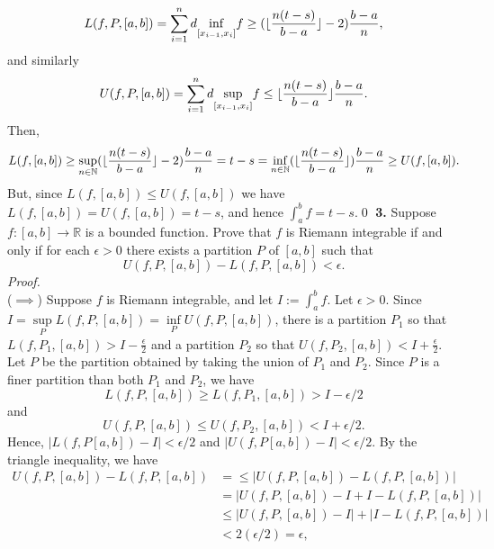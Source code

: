 \documentclass{article}
\DeclarePairedDelimiter\floor{\lfloor}{\rfloor}
\begin{document}
\begin{equation*}
    L(f,P,[a,b])=\sum_{i=1}^{n}d\underset{[x_{i-1},x_i]}{\inf}f\geq(\floor{\frac{n(t-s)}{b-a}}-2)\frac{b-a}{n},
\end{equation*}
and similarly
\begin{equation*}
    U(f,P,[a,b])=\sum_{i=1}^{n}d\underset{[x_{i-1},x_i]}{\sup}f\leq\floor{\frac{n(t-s)}{b-a}}\frac{b-a}{n}.
\end{equation*}
Then,
\begin{equation*}
    L(f,[a,b])
    \geq \underset{n\in \mathbb{N}}{\sup}(\floor{\frac{n(t-s)}{b-a}}-2)\frac{b-a}{n}
    = t-s
    = \underset{n\in \mathbb{N}}{\inf}(\floor{\frac{n(t-s)}{b-a}})\frac{b-a}{n}
    \geq U(f,[a,b]).
\end{equation*}
But, since $L(f,[a,b])\leq U(f,[a,b])$ we have $L(f,[a,b])= U(f,[a,b])=t-s$, and hence $\int_{a}^{b}f=t-s$.\qed
\newpage
\textbf{3. }Suppose $f:[a,b]\rightarrow \mathbb{R}$ is a bounded function. Prove that $f$ is Riemann integrable if and only if for each $\epsilon >0$ there exists a partition $P$ of $[a,b]$ such that 
\begin{equation*}
    U(f,P,[a,b])-L(f,P,[a,b])<\epsilon.
\end{equation*}
\textit{Proof.} \\
($\implies$) Suppose $f$ is Riemann integrable, and let $I:=\int_{a}^{b}f$. Let $\epsilon >0$. Since $I=\underset{P}\sup L(f,P,[a,b])=\underset{P}\inf U(f,P,[a,b])$, there is a partition $P_1$ so that $L(f,P_1,[a,b])>I-\frac\epsilon 2$ and a partition $P_2$ so that $U(f,P_2,[a,b])<I+\frac{\epsilon}2$. Let $P$ be the partition obtained by taking the union of $P_1$ and $P_2$. Since $P$ is a finer partition than both $P_1$ and $P_2$, we have
\begin{equation*}
    L(f,P,[a,b])\geq L(f,P_1,[a,b])>I-\epsilon/2
\end{equation*}
and
\begin{equation*}
    U(f,P,[a,b])\leq U(f,P_2,[a,b])<I+\epsilon/2.
\end{equation*}
\noindent
Hence, $|L(f,P[a,b])-I|<\epsilon/2$ and $|U(f,P[a,b])-I|<\epsilon/2$. By the triangle inequality, we have 
\begin{align*}
    U(f,P,[a,b])-L(f,P,[a,b])&=\leq|U(f,P,[a,b])-L(f,P,[a,b])|\\
    &=|U(f,P,[a,b])-I+I-L(f,P,[a,b])|\\
    &\leq|U(f,P,[a,b])-I|+|I-L(f,P,[a,b])|\\
    &<2(\epsilon/2)=\epsilon,
\end{align*}
\end{document}
